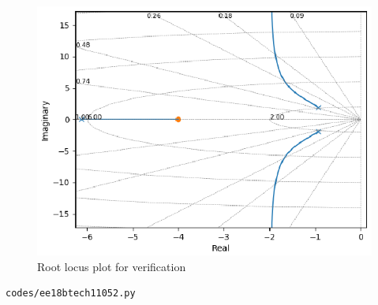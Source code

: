 \begin{enumerate}[label=\thesection.\arabic*.,ref=\thesection.\theenumi]
\begin{figure}
\centering
\includegraphics[width=\columnwidth]{figs/ee18btech11052.eps}
\caption{Root locus plot for verification}
\end{figure}


\begin{lstlisting}
codes/ee18btech11052.py
\end{lstlisting}
    
\end{enumerate}

